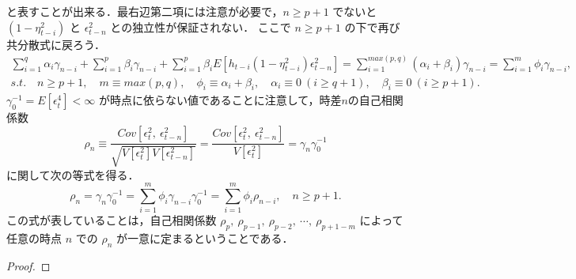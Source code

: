 \documentclass[8pt]{jsarticle}
\newtheorem{proof}{証明}
\def\Exp#1{\mbox{$E \left[ #1 \right]$}}
\def\Var#1{\mbox{$V \left[ #1 \right]$}}
\def\Cov#1#2{\mbox{$Cov \left[ #1,\ #2 \right]$}}
\begin{document}
\begin{breakbox}
	と表すことが出来る．最右辺第二項には注意が必要で，$n \geq p+1$ でないと $(1 - \eta_{t-i}^2)$ と $\epsilon_{t-n}^2$ との独立性が保証されない．
	ここで $n \geq p+1$ の下で再び共分散式に戻ろう．
	\begin{align*}
		\sum_{i=1}^{q} \alpha_i \gamma_{n - i} 
			+ \sum_{i=1}^{p} \beta_i \gamma_{n - i} 
			+ \sum_{i=1}^{p} \beta_i \Exp{h_{t-i}(1 - \eta_{t-i}^2) \epsilon_{t-n}^2} 
		= \sum_{i=1}^{max(p, q)} (\alpha_i + \beta_i) \gamma_{n - i}
		= \sum_{i=1}^{m} \phi_i \gamma_{n - i}, \\
		s.t.\quad n \geq p+1,\quad m \equiv max(p, q),\quad \phi_i \equiv \alpha_i + \beta_i,\quad \alpha_i \equiv 0\ (i \geq q+1),\quad \beta_i \equiv 0\ (i \geq p+1).
	\end{align*}
	$\gamma_0^{-1} = \Exp{\epsilon_t^4} < \infty$ が時点に依らない値であることに注意して，時差$n$の自己相関係数 
	\[
		\rho_n \equiv \frac{\Cov{\epsilon_t^2}{\epsilon_{t-n}^2}}{\sqrt{\Var{\epsilon_t^2}\Var{\epsilon_{t-n}^2}}} 
		= \frac{\Cov{\epsilon_t^2}{\epsilon_{t-n}^2}}{\Var{\epsilon_t^2}} 
		= \gamma_n \gamma_0^{-1}
	\]
	に関して次の等式を得る．
	\[
		\rho_n = \gamma_n \gamma_0^{-1} = \sum_{i=1}^{m} \phi_i \gamma_{n - i} \gamma_0^{-1} = \sum_{i=1}^{m} \phi_i \rho_{n - i},\quad  n \geq p+1.
	\]
	この式が表していることは，自己相関係数 $\rho_{p},\ \rho_{p-1},\ \rho_{p-2},\ \cdots,\ \rho_{p+1-m}$ によって任意の時点 $n$ での $\rho_n$ が一意に定まるということである．\\
	 
\end{breakbox}
\begin{proof}
\end{proof}
\end{document}
